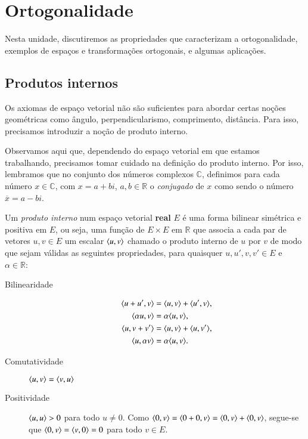 \chapter{Ortogonalidade} 

Nesta unidade, discutiremos as propriedades que caracterizam a ortogonalidade, exemplos de espaços e transformações ortogonais, e algumas aplicações.

\section{Produtos internos}

Os axiomas de espaço vetorial não são suficientes para abordar certas noções geométricas como ângulo, perpendicularismo, comprimento, distância. Para isso, precisamos introduzir a noção de produto interno.

Observamos aqui que, dependendo do espaço vetorial em que estamos trabalhando, precisamos tomar cuidado na definição do produto interno. Por isso, lembramos que no conjunto dos números complexos ${\mathbb{C}}$, definimos para cada número $x \in {\mathbb{C}}$, com $x=a+bi$, $a,b \in {\mathbb{R}}$ o \emph{conjugado} de $x$ como sendo o número $\overline{x} = a-bi$.

\begin{defi}
  Um \emph{produto interno} num espaço vetorial \textbf{real} $E$ é uma forma bilinear simétrica e positiva em $E$, ou seja, uma função de $E\times E$ em ${\mathbb{R}}$ que associa a cada par de vetores $u,v\in E$ um escalar $\langle u, v \rangle$ chamado o produto interno de $u$ por $v$ de modo que sejam válidas as seguintes propriedades, para quaisquer $u,u',v,v' \in E$ e $\alpha \in {\mathbb{R}}$:
  \begin{description}
  \item[Bilinearidade] \begin{align*}
      \langle u+u', v \rangle &= \langle u, v \rangle+\langle u', v \rangle,\\
      \langle \alpha u, v \rangle &= \alpha \langle u, v \rangle,\\
      \langle u, v+v' \rangle &= \langle u, v \rangle+\langle u, v' \rangle,\\
      \langle u, \alpha v \rangle &= \alpha \langle u, v \rangle.
    \end{align*}
  \item[Comutatividade] $\langle u, v \rangle = \langle v, u \rangle$
  \item[Positividade] $\langle u, u \rangle > 0$ para todo $u\ne 0$. Como $\langle 0, v \rangle = \langle 0+0, v \rangle = \langle 0, v \rangle + \langle 0, v \rangle$, segue-se que $\langle 0, v \rangle = \langle v, 0 \rangle = 0$ para todo $v\in E$.
  \end{description}
\end{defi}

